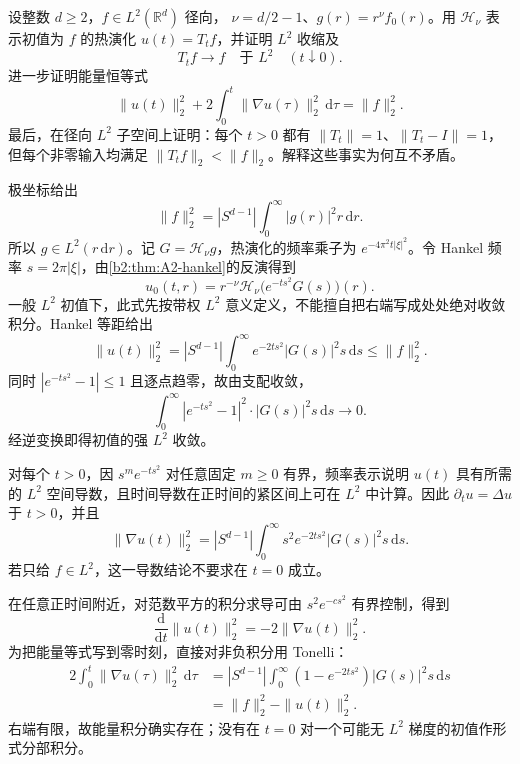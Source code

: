 \begin{exercise}\label{b2:ex:A2-radial-heat}
设整数 \(d\geq2\)，\(f\in L^2(\mathbb R^d)\) 径向，
\(\nu=d/2-1\)、\(g(r)=r^\nu f_0(r)\)。用 \(\mathcal H_\nu\) 表示初值为 \(f\) 的热演化 \(u(t)=T_tf\)，并证明 \(L^2\) 收缩及
\[
 T_tf\longrightarrow f\quad\text{于 }L^2
       \quad(t\downarrow0).
\]
进一步证明能量恒等式
\[
 \|u(t)\|_2^2
       +2\int_0^t\|\nabla u(\tau)\|_2^2\,\mathrm d\tau
       =\|f\|_2^2.
\]
最后，在径向 \(L^2\) 子空间上证明：每个 \(t>0\) 都有
\(\|T_t\|=1\)、\(\|T_t-I\|=1\)，但每个非零输入均满足
\(\|T_tf\|_2<\|f\|_2\)。解释这些事实为何互不矛盾。
\end{exercise}
\begin{solution}
极坐标给出
\[
 \|f\|_2^2=|S^{d-1}|
       \int_0^\infty|g(r)|^2r\,\mathrm dr.
\]
所以 \(g\in L^2(r\,\mathrm dr)\)。记
\(G=\mathcal H_\nu g\)，热演化的频率乘子为
\(e^{-4\pi^2t|\xi|^2}\)。令 Hankel 频率 \(s=2\pi|\xi|\)，由\cref{b2:thm:A2-hankel}的反演得到
\[
 u_0(t,r)
 =r^{-\nu}\mathcal H_\nu
       \bigl(e^{-ts^2}G(s)\bigr)(r).
\]
一般 \(L^2\) 初值下，此式先按带权 \(L^2\) 意义定义，不能擅自把右端写成处处绝对收敛积分。Hankel 等距给出
\[
 \|u(t)\|_2^2
 =|S^{d-1}|\int_0^\infty e^{-2ts^2}|G(s)|^2s\,\mathrm ds
 \leq\|f\|_2^2.
\]
同时 \(|e^{-ts^2}-1|\leq1\) 且逐点趋零，故由支配收敛，
\[
 \int_0^\infty|e^{-ts^2}-1|^2\cdot|G(s)|^2s\,\mathrm ds
       \longrightarrow0.
\]
经逆变换即得初值的强 \(L^2\) 收敛。

对每个 \(t>0\)，因 \(s^m e^{-ts^2}\) 对任意固定 \(m\geq0\) 有界，频率表示说明 \(u(t)\) 具有所需的 \(L^2\) 空间导数，且时间导数在正时间的紧区间上可在 \(L^2\) 中计算。因此
\(\partial_tu=\Delta u\) 于 \(t>0\)，并且
\[
 \|\nabla u(t)\|_2^2
 =|S^{d-1}|\int_0^\infty
       s^2e^{-2ts^2}|G(s)|^2s\,\mathrm ds.
\]
若只给 \(f\in L^2\)，这一导数结论不要求在 \(t=0\) 成立。

在任意正时间附近，对范数平方的积分求导可由
\(s^2e^{-c s^2}\) 有界控制，得到
\[
 \frac{\mathrm d}{\mathrm dt}\|u(t)\|_2^2
       =-2\|\nabla u(t)\|_2^2.
\]
为把能量等式写到零时刻，直接对非负积分用 Tonelli：
\[
 \begin{aligned}
 2\int_0^t\|\nabla u(\tau)\|_2^2\,\mathrm d\tau
 &=|S^{d-1}|\int_0^\infty
       (1-e^{-2ts^2})|G(s)|^2s\,\mathrm ds\\
 &=\|f\|_2^2-\|u(t)\|_2^2.
 \end{aligned}
\]
右端有限，故能量积分确实存在；没有在 \(t=0\) 对一个可能无 \(L^2\) 梯度的初值作形式分部积分。


\end{solution}
